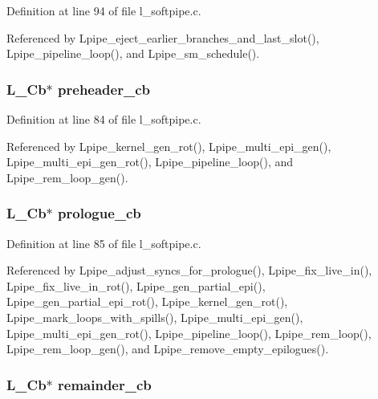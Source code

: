 Definition at line 94 of file l\_\-softpipe.c.

Referenced by Lpipe\_\-eject\_\-earlier\_\-branches\_\-and\_\-last\_\-slot(), Lpipe\_\-pipeline\_\-loop(), and Lpipe\_\-sm\_\-schedule().
\subsubsection{\setlength{\rightskip}{0pt plus 5cm}L\_\-Cb$\ast$ \bf{preheader\_\-cb}}\label{l__softpipe__int_8h_4ee6d00e67672cc9a04b6f5f533bfb72}




Definition at line 84 of file l\_\-softpipe.c.

Referenced by Lpipe\_\-kernel\_\-gen\_\-rot(), Lpipe\_\-multi\_\-epi\_\-gen(), Lpipe\_\-multi\_\-epi\_\-gen\_\-rot(), Lpipe\_\-pipeline\_\-loop(), and Lpipe\_\-rem\_\-loop\_\-gen().
\subsubsection{\setlength{\rightskip}{0pt plus 5cm}L\_\-Cb$\ast$ \bf{prologue\_\-cb}}\label{l__softpipe__int_8h_4708e528902bf49b9c374df3e644309d}




Definition at line 85 of file l\_\-softpipe.c.

Referenced by Lpipe\_\-adjust\_\-syncs\_\-for\_\-prologue(), Lpipe\_\-fix\_\-live\_\-in(), Lpipe\_\-fix\_\-live\_\-in\_\-rot(), Lpipe\_\-gen\_\-partial\_\-epi(), Lpipe\_\-gen\_\-partial\_\-epi\_\-rot(), Lpipe\_\-kernel\_\-gen\_\-rot(), Lpipe\_\-mark\_\-loops\_\-with\_\-spills(), Lpipe\_\-multi\_\-epi\_\-gen(), Lpipe\_\-multi\_\-epi\_\-gen\_\-rot(), Lpipe\_\-pipeline\_\-loop(), Lpipe\_\-rem\_\-loop(), Lpipe\_\-rem\_\-loop\_\-gen(), and Lpipe\_\-remove\_\-empty\_\-epilogues().
\subsubsection{\setlength{\rightskip}{0pt plus 5cm}L\_\-Cb$\ast$ \bf{remainder\_\-cb}}\label{l__softpipe__int_8h_785a1b69c62478bf5624354abd3955e1}




